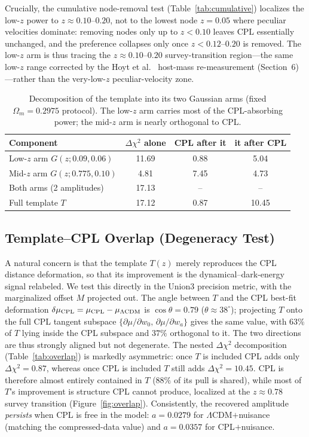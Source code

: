 \documentclass[11pt]{article}
\begin{document}
Crucially, the cumulative node-removal test (Table~\ref{tab:cumulative}) localizes the
low-$z$ power to $z\approx0.10$--$0.20$, not to the lowest node $z=0.05$ where peculiar
velocities dominate: removing nodes only up to $z<0.10$ leaves CPL essentially
unchanged, and the preference collapses only once $z<0.12$--$0.20$ is removed. The
low-$z$ arm is thus tracing the $z\approx0.10$--$0.20$ survey-transition region---the
same low-$z$ range corrected by the Hoyt et al.~\cite{hoyt2026} host-mass re-measurement
(Section~6)---rather than the very-low-$z$ peculiar-velocity zone.

\begin{table}[h]
\centering
\caption{Decomposition of the template into its two Gaussian arms (fixed
$\Omega_m=0.2975$ protocol). The low-$z$ arm carries most of the CPL-absorbing power;
the mid-$z$ arm is nearly orthogonal to CPL.}
\label{tab:components}
\begin{tabular}{lccc}
\toprule
Component & $\Delta\chi^2$ alone & CPL after it & it after CPL \\
\midrule
Low-$z$ arm $G(z;0.09,0.06)$  & 11.69 & 0.88 & 5.04 \\
Mid-$z$ arm $G(z;0.775,0.10)$ & 4.81  & 7.45 & 4.73 \\
Both arms (2 amplitudes)      & 17.13 & --   & --   \\
Full template $T$             & 17.12 & 0.87 & 10.45 \\
\bottomrule
\end{tabular}
\end{table}

\subsection{Template--CPL Overlap (Degeneracy Test)}
\label{sec:overlap}

A natural concern is that the template $T(z)$ merely reproduces the CPL distance
deformation, so that its improvement is the dynamical--dark-energy signal relabeled.
We test this directly in the Union3 precision metric, with the marginalized offset $M$
projected out. The angle between $T$ and the CPL best-fit deformation
$\delta\mu_{\rm CPL}=\mu_{\rm CPL}-\mu_{\Lambda\rm CDM}$ is $\cos\theta=0.79$
($\theta\approx38^\circ$); projecting $T$ onto the full CPL tangent subspace
$\{\partial\mu/\partial w_0,\,\partial\mu/\partial w_a\}$ gives the same value, with
$63\%$ of $T$ lying inside the CPL subspace and $37\%$ orthogonal to it. The two
directions are thus strongly aligned but not degenerate. The nested $\Delta\chi^2$
decomposition (Table~\ref{tab:overlap}) is markedly asymmetric: once $T$ is included CPL
adds only $\Delta\chi^2=0.87$, whereas once CPL is included $T$ still adds
$\Delta\chi^2=10.45$. CPL is therefore almost entirely contained in $T$ ($88\%$ of its
pull is shared), while most of $T$'s improvement is structure CPL cannot produce,
localized at the $z\approx0.78$ survey transition (Figure~\ref{fig:overlap}).
Consistently, the recovered amplitude \emph{persists} when CPL is free in the model:
$a=0.0279$ for $\Lambda$CDM$+$nuisance (matching the compressed-data value) and
$a=0.0357$ for CPL$+$nuisance.
\end{document}
